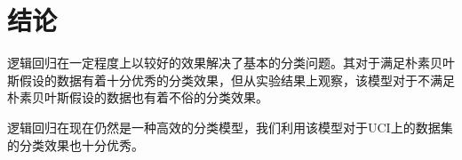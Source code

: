 \documentclass[12pt]{article}
\begin{document}
\section{结论}
逻辑回归在一定程度上以较好的效果解决了基本的分类问题。其对于满足朴素贝叶斯假设的数据有着十分优秀的分类效果，但从实验结果上观察，该模型对于不满足朴素贝叶斯假设的数据也有着不俗的分类效果。\par
逻辑回归在现在仍然是一种高效的分类模型，我们利用该模型对于UCI上的数据集的分类效果也十分优秀。
\newpage
\end{document}
